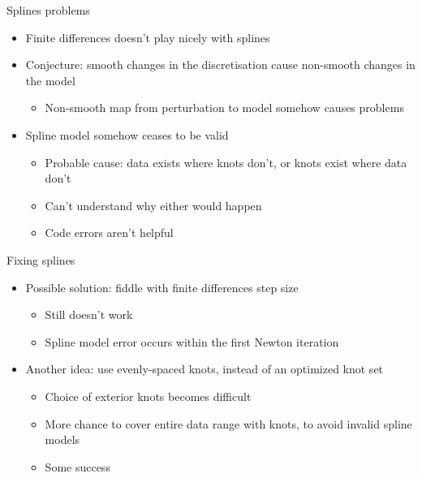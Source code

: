 \documentclass[presentation]{beamer}
\begin{document}
\begin{frame}[<+->][label={sec:org114c4c6}]{Splines problems}
\begin{itemize}
\item Finite differences doesn't play nicely with splines
\item Conjecture: smooth changes in the discretisation cause non-smooth changes in the model
\begin{itemize}
\item Non-smooth map from perturbation to model somehow causes problems
\end{itemize}
\end{itemize}
\vfill
\begin{itemize}
\item Spline model somehow ceases to be valid
\begin{itemize}
\item Probable cause: data exists where knots don't, or knots exist where data don't
\item Can't understand why either would happen
\item Code errors aren't helpful
\end{itemize}
\end{itemize}
\end{frame}

\begin{frame}[<+->][label={sec:org33ecb54}]{Fixing splines}
\begin{itemize}
\item Possible solution: fiddle with finite differences step size
\begin{itemize}
\item Still doesn't work
\item Spline model error occurs within the first Newton iteration
\end{itemize}
\end{itemize}
\vfill
\begin{itemize}
\item Another idea: use evenly-spaced knots, instead of an optimized knot set
\begin{itemize}
\item Choice of exterior knots becomes difficult
\item More chance to cover entire data range with knots, to avoid invalid spline models
\item Some success
\end{itemize}
\end{itemize}
\end{frame}
\end{document}
